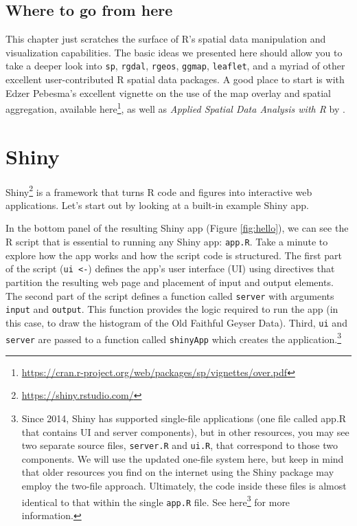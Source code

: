 \documentclass[]{krantz}
\renewcommand{\href}[2]{#2\footnote{\url{#1}}}
\begin{document}
\hypertarget{where-to-go-from-here}{%
\section{Where to go from here}\label{where-to-go-from-here}}

This chapter just scratches the surface of R's spatial data manipulation and visualization capabilities. The basic ideas we presented here should allow you to take a deeper look into \texttt{sp}, \texttt{rgdal}, \texttt{rgeos}, \texttt{ggmap}, \texttt{leaflet}, and a myriad of other excellent user-contributed R spatial data packages. A good place to start is with Edzer Pebesma's excellent vignette on the use of the map overlay and spatial aggregation, available \href{https://cran.r-project.org/web/packages/sp/vignettes/over.pdf}{here}, as well as \emph{Applied Spatial Data Analysis with R} by \cite{Bivand13}.

\hypertarget{shiny}{%
\chapter{Shiny}\label{shiny}}

\href{https://shiny.rstudio.com/}{Shiny} is a framework that turns R code and figures into interactive web applications. Let's start out by looking at a built-in example Shiny app.

In the bottom panel of the resulting Shiny app (Figure \ref{fig:hello}), we can see the R script that is essential to running any Shiny app: \texttt{app.R}. Take a minute to explore how the app works and how the script code is structured. The first part of the script (\texttt{ui\ \textless{}-}) defines the app's user interface (UI) using directives that partition the resulting web page and placement of input and output elements. The second part of the script defines a function called \texttt{server} with arguments \texttt{input} and \texttt{output}. This function provides the logic required to run the app (in this case, to draw the histogram of the Old Faithful Geyser Data). Third, \texttt{ui} and \texttt{server} are passed to a function called \texttt{shinyApp} which creates the application.\footnote{Since 2014, Shiny has supported single-file applications (one file called app.R that contains UI and server components), but in other resources, you may see two separate source files, \texttt{server.R} and \texttt{ui.R}, that correspond to those two components. We will use the updated one-file system here, but keep in mind that older resources you find on the internet using the Shiny package may employ the two-file approach. Ultimately, the code inside these files is almost identical to that within the single \texttt{app.R} file. See \href{https://shiny.rstudio.com/articles/app-formats.html}{here} for more information.}
\end{document}
